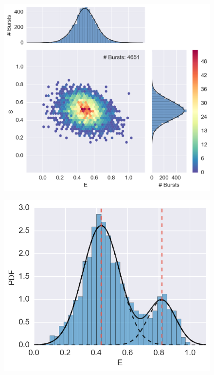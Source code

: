 

\begin{figure}
\begin{center}
\includegraphics[width=\singlefig]{"figures/alex_jointplot_fretsel/alex_jointplot_fretsel"}
\caption[]{}
\end{center}
\end{figure}



\begin{figure}
\begin{center}
\includegraphics[width=0.8\singlefig]{"figures/hist_fit/hist_fit"}
\caption[]{}
\end{center}
\end{figure}

